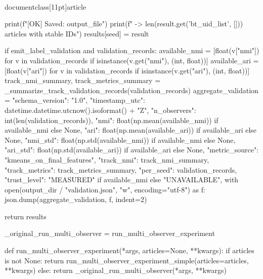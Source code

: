 \\documentclass[11pt]{article}
\begin{document}
\begin{CodeBlock}
        print(f"[OK] Saved: {output_file}")
        print(f"  -> {len(result.get('bt_uid_list', []))} articles with stable IDs")
        results[seed] = result

    if emit_label_validation and validation_records:
        available_nmi = [float(v["nmi"]) for v in validation_records if isinstance(v.get("nmi"), (int, float))]
        available_ari = [float(v["ari"]) for v in validation_records if isinstance(v.get("ari"), (int, float))]
        track_nmi_summary, track_metrics_summary = _summarize_track_validation_records(validation_records)
        aggregate_validation = {
            "schema_version": "1.0",
            "timestamp_utc": datetime.datetime.utcnow().isoformat() + "Z",
            "n_observers": int(len(validation_records)),
            "nmi": float(np.mean(available_nmi)) if available_nmi else None,
            "ari": float(np.mean(available_ari)) if available_ari else None,
            "nmi_std": float(np.std(available_nmi)) if available_nmi else None,
            "ari_std": float(np.std(available_ari)) if available_ari else None,
            "metric_source": "kmeans_on_final_features",
            "track_nmi": track_nmi_summary,
            "track_metrics": track_metrics_summary,
            "per_seed": validation_records,
            "trust_level": "MEASURED" if available_nmi else "UNAVAILABLE",
        }
        with open(output_dir / "validation.json", "w", encoding="utf-8") as f:
            json.dump(aggregate_validation, f, indent=2)

    return results


_original_run_multi_observer = run_multi_observer_experiment

def run_multi_observer_experiment(*args, articles=None, **kwargs):
    if articles is not None:
        return run_multi_observer_experiment_simple(articles=articles, **kwargs)
    else:
        return _original_run_multi_observer(*args, **kwargs)

\end{CodeBlock}
\end{document}
